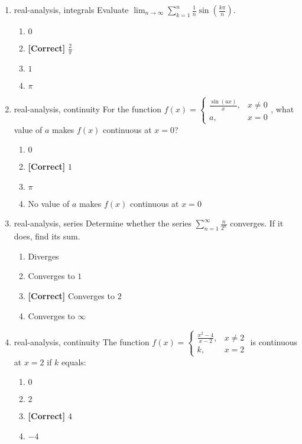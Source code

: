 \documentclass{article}
\newenvironment{problem}{\item}{}
\newcommand{\choice}{\item}
\newcommand{\correctchoice}{\item \textbf{[Correct] }}
\newcommand{\tags}[1]{#1} %
\begin{document}
\begin{enumerate}
        \begin{problem}
            \tags{real-analysis, integrals}
            Evaluate $\lim_{n \to \infty} \sum_{k=1}^{n} \frac{1}{n}\sin\left(\frac{k\pi}{n}\right)$.
            \begin{enumerate}
                \choice $0$
                \correctchoice $\frac{2}{\pi}$
                \choice $1$
                \choice $\pi$
            \end{enumerate}
        \end{problem}
        
        \begin{problem}
            \tags{real-analysis, continuity}
            For the function $f(x) = \begin{cases}
                \frac{\sin(ax)}{x}, & x \neq 0 \\
                a, & x = 0
            \end{cases}$, what value of $a$ makes $f(x)$ continuous at $x = 0$?
            \begin{enumerate}
                \choice $0$
                \correctchoice $1$
                \choice $\pi$
                \choice No value of $a$ makes $f(x)$ continuous at $x = 0$
            \end{enumerate}
        \end{problem}
        
        \begin{problem}
            \tags{real-analysis, series}
            Determine whether the series $\sum_{n=1}^{\infty} \frac{n}{2^n}$ converges. If it does, find its sum.
            \begin{enumerate}
                \choice Diverges
                \choice Converges to $1$
                \correctchoice Converges to $2$
                \choice Converges to $\infty$
            \end{enumerate}
        \end{problem}
        
        \begin{problem}
            \tags{real-analysis, continuity}
            The function $f(x) = \begin{cases}
                \frac{x^2-4}{x-2}, & x \neq 2 \\
                k, & x = 2
            \end{cases}$ is continuous at $x = 2$ if $k$ equals:
            \begin{enumerate}
                \choice $0$
                \choice $2$
                \correctchoice $4$
                \choice $-4$
            \end{enumerate}
        \end{problem}
        

\end{enumerate}
\end{document}
